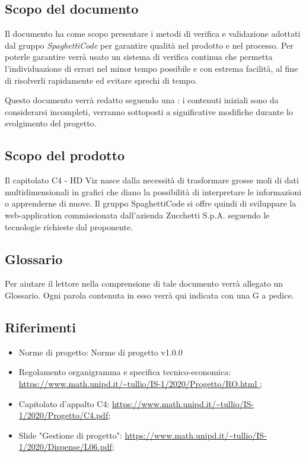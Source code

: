 \documentclass[../piano_di_qualifica.tex]{subfiles}
\begin{document}
\subsection{Scopo del documento}%
\label{sub:scopo_del_documento}
Il documento ha come scopo presentare i metodi di verifica e validazione adottati dal gruppo \emph{SpaghettiCode} per garantire qualità nel prodotto e nel processo. Per poterle garantire verrà usato un sistema di verifica continua che permetta l'individuazione di errori nel minor tempo possibile e con estrema facilità, al fine di risolverli rapidamente ed evitare sprechi di tempo.

Questo documento verrà redatto seguendo una : i contenuti iniziali sono da considerarsi incompleti, verranno sottoposti a significative modifiche durante lo svolgimento del progetto. 

\subsection{Scopo del prodotto}%
\label{sub:scopo_prodotto}
Il capitolato C4 - HD Viz nasce dalla necessità di trasformare grosse moli di dati multidimensionali in grafici che diano la possibilità di interpretare le informazioni o apprenderne di nuove. Il gruppo SpaghettiCode si offre quindi di sviluppare la web-application commissionata dall’azienda Zucchetti S.p.A. seguendo le tecnologie richieste dal proponente. 

\subsection{Glossario}%
\label{sub:glossario}
Per aiutare il lettore nella comprensione di tale documento verrà allegato un Glossario. Ogni parola contenuta in esso verrà qui indicata con una G a pedice.

\subsection{Riferimenti}%
\label{sub:riferimenti}
\begin{itemize}
\item Norme di progetto: Norme di progetto v1.0.0
\item Regolamento organigramma e specifica tecnico-economica: \url{https://www.math.unipd.it/~tullio/IS-1/2020/Progetto/RO.html };
\item Capitolato d’appalto C4: \url{https://www.math.unipd.it/~tullio/IS-1/2020/Progetto/C4.pdf};
\item Slide "Gestione di progetto": \url{https://www.math.unipd.it/~tullio/IS-1/2020/Dispense/L06.pdf};
\end{itemize}
\end{document}
